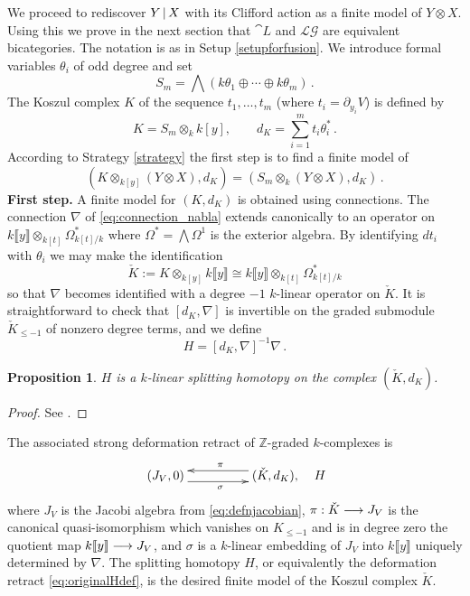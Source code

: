 \documentclass[english,letter paper,12pt,leqno]{article}
\newtheorem{proposition}[theorem]{Proposition}
\theoremstyle{example}
\numberwithin{equation}{section}
\def\LG{\mathcal{LG}}
\begin{document}
We proceed to rediscover $Y \,|\, X$ with its Clifford action as a finite model of $Y \otimes X$. Using this we prove in the next section that $\cat{L}$ and $\LG$ are equivalent bicategories. The notation is as in Setup \ref{setupforfusion}. We introduce formal variables $\theta_i$ of odd degree and set
\[
S_m = \bigwedge\left( k \theta_1 \oplus \cdots \oplus k \theta_m \right)\,.
\]
The Koszul complex $K$ of the sequence $t_1,\ldots,t_m$ (where $t_i = \partial_{y_i} V$) is defined by
\begin{equation}\label{defn:koszul}
K = S_m \otimes_k k[y], \qquad d_K = \sum_{i=1}^m t_i \theta_i^*\,.
\end{equation}
According to Strategy \ref{strategy} the first step is to find a finite model of
\[
( K \otimes_{k[y]} ( Y \otimes X ), d_K ) = ( S_m \otimes_k ( Y \otimes X ), d_K )\,.
\]
\textbf{First step.} A finite model for $(K, d_K)$ is obtained using connections. The connection $\nabla$ of \eqref{eq:connection_nabla} extends canonically to an operator on $k\llbracket y \rrbracket \otimes_{k[t]} \Omega^*_{k[t]/k}$ where $\Omega^* = \bigwedge \Omega^1$ is the exterior algebra. By identifying $d t_i$ with $\theta_i$ we may make the identification
\[
\check{K} := K \otimes_{k[y]} k\llbracket y \rrbracket \cong k\llbracket y \rrbracket \otimes_{k[t]} \Omega^*_{k[t]/k}
\]
so that $\nabla$ becomes identified with a degree $-1$ $k$-linear operator on $\check{K}$.  It is straightforward to check that $[d_K, \nabla]$ is invertible on the graded submodule $\check{K}_{\le -1}$ of nonzero degree terms, and we define
\[
H = [d_K, \nabla]^{-1} \nabla\,.
\]

\begin{proposition} $H$ is a $k$-linear splitting homotopy on the complex $(\check{K},d_K)$.
\end{proposition}
\begin{proof}
See \cite[Section 8.1]{dm1102.2957}.
\end{proof}

The associated strong deformation retract of $\mathbb{Z}$-graded $k$-complexes is
\begin{equation}\label{eq:originalHdef}
\xymatrix@C+2pc{
(J_V,0) \ar@<-1ex>[r]_{\sigma} & (\check{K}, d_K), \ar@<-1ex>[l]_{\pi}
} \quad H
\end{equation}
where $J_V$ is the Jacobi algebra from \eqref{eq:defnjacobian}, $\pi: \check{K} \longrightarrow J_V$ is the canonical quasi-isomorphism which vanishes on $K_{\le -1}$ and is in degree zero the quotient map $k\llbracket y \rrbracket \longrightarrow J_V$, and $\sigma$ is a $k$-linear embedding of $J_V$ into $k\llbracket y \rrbracket$ uniquely determined by $\nabla$. The splitting homotopy $H$, or equivalently the deformation retract \eqref{eq:originalHdef}, is the desired finite model of the Koszul complex $\check{K}$.
\end{document}
